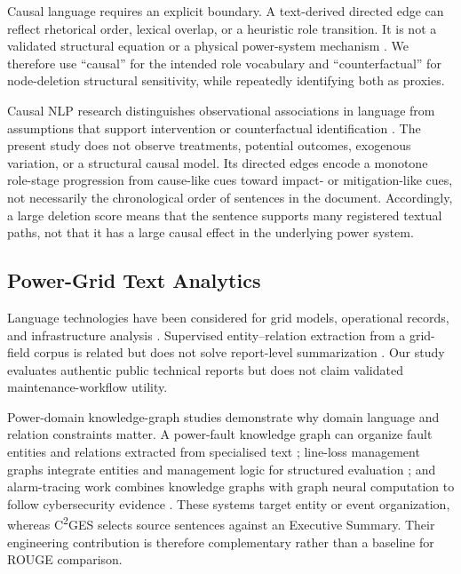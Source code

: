 \documentclass[applsci,article,submit,moreauthors]{Definitions/mdpi}
\newcommand{\cges}{C\textsuperscript{2}GES}
\begin{document}
Causal language requires an explicit boundary. A text-derived directed edge can reflect rhetorical order, lexical overlap, or a heuristic role transition. It is not a validated structural equation or a physical power-system mechanism \cite{feder2022causal}. We therefore use ``causal'' for the intended role vocabulary and ``counterfactual'' for node-deletion structural sensitivity, while repeatedly identifying both as proxies.

Causal NLP research distinguishes observational associations in language from assumptions that support intervention or counterfactual identification \cite{feder2022causal,du2022ecare}. The present study does not observe treatments, potential outcomes, exogenous variation, or a structural causal model. Its directed edges encode a monotone role-stage progression from cause-like cues toward impact- or mitigation-like cues, not necessarily the chronological order of sentences in the document. Accordingly, a large deletion score means that the sentence supports many registered textual paths, not that it has a large causal effect in the underlying power system.

\subsection{Power-Grid Text Analytics}

Language technologies have been considered for grid models, operational records, and infrastructure analysis \cite{xie2022massively,hamann2024foundation,madabhushi2023survey,srinivasan2023artificial}. Supervised entity--relation extraction from a grid-field corpus is related but does not solve report-level summarization \cite{meng2023gridfield}. Our study evaluates authentic public technical reports but does not claim validated maintenance-workflow utility.

Power-domain knowledge-graph studies demonstrate why domain language and relation constraints matter. A power-fault knowledge graph can organize fault entities and relations extracted from specialised text \cite{liu2022powerfault}; line-loss management graphs integrate entities and management logic for structured evaluation \cite{li2024lineloss}; and alarm-tracing work combines knowledge graphs with graph neural computation to follow cybersecurity evidence \cite{ma2025alarm}. These systems target entity or event organization, whereas \cges{} selects source sentences against an Executive Summary. Their engineering contribution is therefore complementary rather than a baseline for ROUGE comparison.
\end{document}
